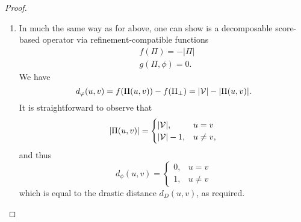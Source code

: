 \begin{proof}
\begin{enumerate}
        \item In much the same way as for \varbasedcond{} above, one can show
              \partbasedcond{} is a decomposable score-based operator via
              refinement-compatible functions
              \begin{align*}
                &f(\Pi) = -|\Pi| \\
                &g(\Pi, \phi) = 0.
              \end{align*}
              We have
              \[
                d_{\varphi}(u, v)
                = f(\Pi(u, v)) - f(\Pi_\bot)
                = |\mathcal{V}| - |\Pi(u, v)|.
              \]
              It is straightforward to observe that
              \[
                  |\Pi(u, v)| = \begin{cases}
                      |\mathcal{V}|,& u = v \\
                      |\mathcal{V}| - 1,& u \ne v,
                  \end{cases}
              \]
              and thus
              \[
                  d_{\phi}(u, v)
                  = \begin{cases}
                      0,& u = v \\
                      1,& u \ne v
                  \end{cases}
              \]
              which is equal to the drastic distance $d_D(u, v)$, as required.


\end{enumerate}
\end{proof}
